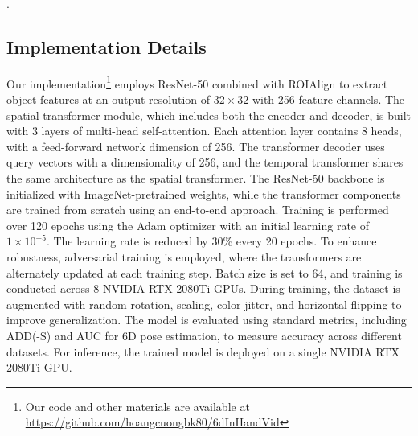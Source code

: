 \noindent {}\DIFaddend .

\subsection{Implementation Details}

Our implementation\footnote{Our code and other materials are available at \url{https://github.com/hoangcuongbk80/6dInHandVid}} employs ResNet-50 \cite{he2016deep} combined with ROIAlign \cite{he2017mask} to extract object features at an output resolution of $32 \times 32$ with 256 feature channels. The spatial transformer module, which includes both the encoder and decoder, is built with 3 layers of multi-head self-attention. Each attention layer contains 8 heads, with a feed-forward network dimension of 256. The transformer decoder uses query vectors with a dimensionality of 256, and the temporal transformer shares the same architecture as the spatial transformer. The ResNet-50 backbone is initialized with ImageNet-pretrained weights, while the transformer components are trained from scratch using an end-to-end approach. Training is performed over 120 epochs using the Adam optimizer with an initial learning rate of $1 \times 10^{-5}$. The learning rate is reduced by 30\% every 20 epochs. To enhance robustness, adversarial training is employed, where the transformers are alternately updated at each training step. Batch size is set to 64, and training is conducted across 8 NVIDIA RTX 2080Ti GPUs. During training, the dataset is augmented with random rotation, scaling, color jitter, and horizontal flipping to improve generalization. The model is evaluated using standard metrics, including ADD(-S) and AUC for 6D pose estimation, to measure accuracy across different datasets. For inference, the trained model is deployed on a single NVIDIA RTX 2080Ti GPU.

